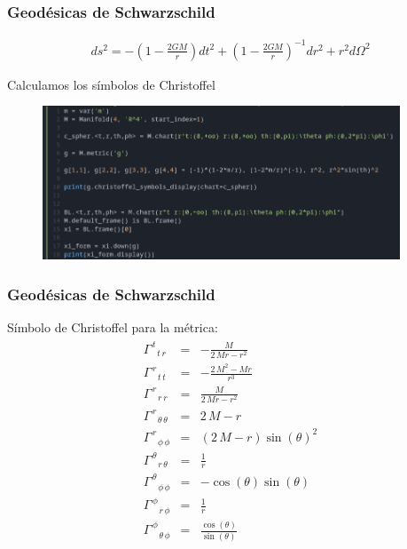 \documentclass{beamer}
\begin{document}
\begin{frame}
\frametitle{Geodésicas de Schwarzschild}
\begin{gather*}
  ds^2 = - \left(1 - \frac{2GM }{r }\right)dt^2 + \left(1 - \frac{2GM }{r}\right) ^ {-1 } dr^2 + r^2 d \Omega^2  
\end{gather*}

Calculamos los símbolos de Christoffel
\begin{figure}[H]
  \begin{center}
    \includegraphics[width=0.95\textwidth]{sage.png}
  \end{center}
\end{figure}
\end{frame}




\begin{frame}
\frametitle{Geodésicas de Schwarzschild}
Símbolo de Christoffel para la métrica: 
\begin{gather*}
\begin{array}{lcl} \Gamma_{ \phantom{\, t} \, t \, r }^{ \, t \phantom{\, t} \phantom{\, r} } & = & -\frac{M}{2 \, M r - r^{2}} \\ \Gamma_{ \phantom{\, r} \, t \, t }^{ \, r \phantom{\, t} \phantom{\, t} } & = & -\frac{2 \, M^{2} - M r}{r^{3}} \\ \Gamma_{ \phantom{\, r} \, r \, r }^{ \, r \phantom{\, r} \phantom{\, r} } & = & \frac{M}{2 \, M r - r^{2}} \\ \Gamma_{ \phantom{\, r} \, {\theta} \, {\theta} }^{ \, r \phantom{\, {\theta}} \phantom{\, {\theta}} } & = & 2 \, M - r \\ \Gamma_{ \phantom{\, r} \, {\phi} \, {\phi} }^{ \, r \phantom{\, {\phi}} \phantom{\, {\phi}} } & = & {\left(2 \, M - r\right)} \sin\left({\theta}\right)^{2} \\ \Gamma_{ \phantom{\, {\theta}} \, r \, {\theta} }^{ \, {\theta} \phantom{\, r} \phantom{\, {\theta}} } & = & \frac{1}{r} \\ \Gamma_{ \phantom{\, {\theta}} \, {\phi} \, {\phi} }^{ \, {\theta} \phantom{\, {\phi}} \phantom{\, {\phi}} } & = & -\cos\left({\theta}\right) \sin\left({\theta}\right) \\ \Gamma_{ \phantom{\, {\phi}} \, r \, {\phi} }^{ \, {\phi} \phantom{\, r} \phantom{\, {\phi}} } & = & \frac{1}{r} \\ \Gamma_{ \phantom{\, {\phi}} \, {\theta} \, {\phi} }^{ \, {\phi} \phantom{\, {\theta}} \phantom{\, {\phi}} } & = & \frac{\cos\left({\theta}\right)}{\sin\left({\theta}\right)} \end{array}
\end{gather*}
\end{frame}
\end{document}
